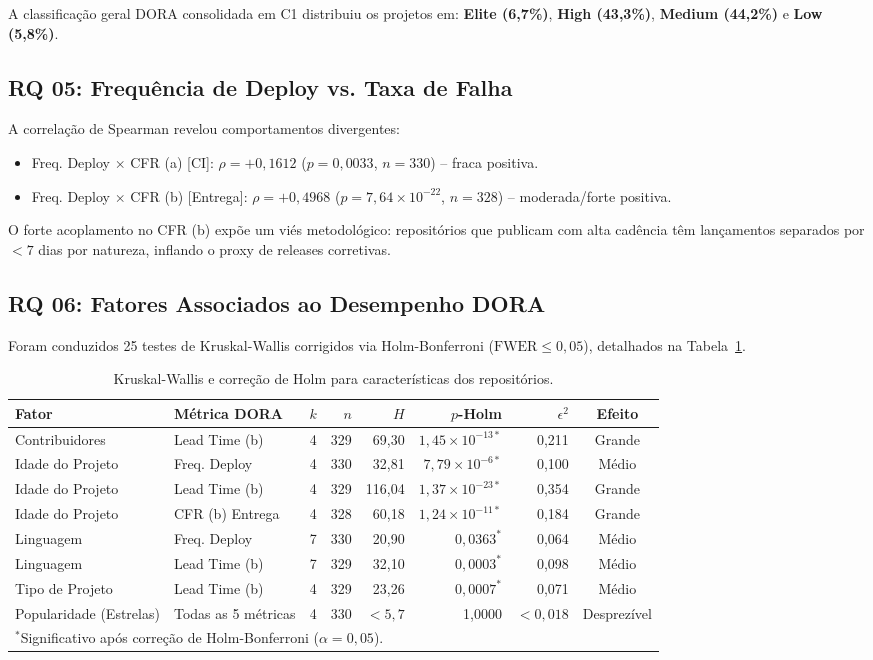 \documentclass[12pt]{article}
\begin{document}
A classificação geral DORA consolidada em C1 distribuiu os projetos em: \textbf{Elite (6,7\%)}, \textbf{High (43,3\%)}, \textbf{Medium (44,2\%)} e \textbf{Low (5,8\%)}.

\subsection{RQ 05: Frequência de Deploy vs. Taxa de Falha}
A correlação de Spearman revelou comportamentos divergentes:
\begin{itemize}
    \item Freq. Deploy $\times$ CFR (a) [CI]: $\rho = +0{,}1612$ ($p = 0{,}0033$, $n = 330$) -- fraca positiva.
    \item Freq. Deploy $\times$ CFR (b) [Entrega]: $\rho = +0{,}4968$ ($p = 7{,}64 \times 10^{-22}$, $n = 328$) -- moderada/forte positiva.
\end{itemize}
O forte acoplamento no CFR (b) expõe um viés metodológico: repositórios que publicam com alta cadência têm lançamentos separados por $< 7$ dias por natureza, inflando o proxy de releases corretivas.

\subsection{RQ 06: Fatores Associados ao Desempenho DORA}
Foram conduzidos 25 testes de Kruskal-Wallis corrigidos via Holm-Bonferroni ($\text{FWER} \le 0{,}05$), detalhados na Tabela~\ref{tab:kruskal}.

\begin{table}[ht]
\centering
\caption{Kruskal-Wallis e correção de Holm para características dos repositórios.}
\label{tab:kruskal}
\small
\begin{tabular}{llrrrrrc}
\toprule
\textbf{Fator} & \textbf{Métrica DORA} & \textbf{$k$} & \textbf{$n$} & \textbf{$H$} & \textbf{$p$-Holm} & \textbf{$\epsilon^2$} & \textbf{Efeito} \\
\midrule
Contribuidores & Lead Time (b) & 4 & 329 & 69,30 & $1{,}45 \times 10^{-13*}$ & 0,211 & Grande \\
Idade do Projeto & Freq. Deploy & 4 & 330 & 32,81 & $7{,}79 \times 10^{-6*}$ & 0,100 & Médio \\
Idade do Projeto & Lead Time (b) & 4 & 329 & 116,04 & $1{,}37 \times 10^{-23*}$ & 0,354 & Grande \\
Idade do Projeto & CFR (b) Entrega & 4 & 328 & 60,18 & $1{,}24 \times 10^{-11*}$ & 0,184 & Grande \\
Linguagem & Freq. Deploy & 7 & 330 & 20,90 & $0{,}0363^*$ & 0,064 & Médio \\
Linguagem & Lead Time (b) & 7 & 329 & 32,10 & $0{,}0003^*$ & 0,098 & Médio \\
Tipo de Projeto & Lead Time (b) & 4 & 329 & 23,26 & $0{,}0007^*$ & 0,071 & Médio \\
Popularidade (Estrelas) & Todas as 5 métricas & 4 & 330 & $< 5{,}7$ & 1,0000 & $< 0{,}018$ & Desprezível \\
\bottomrule
\multicolumn{8}{l}{\footnotesize $^*$Significativo após correção de Holm-Bonferroni ($\alpha = 0{,}05$).}
\end{tabular}
\end{table}
\end{document}
